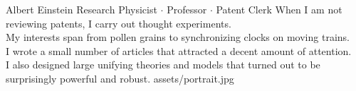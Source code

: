 \documentclass[theme]{cv_einstein}
\begin{document}
    \header
    {Albert Einstein}
    {Research Physicist $\cdot$ Professor $\cdot$ Patent Clerk}
    {
        When I am not reviewing patents, I carry out thought experiments.\\
        My interests span from pollen grains to synchronizing clocks on moving trains.\\
        I wrote a small number of articles that attracted a decent amount of attention.\\
        I also designed large unifying theories and models that turned out to be\\
        surprisingly powerful and robust.%
    }
    {assets/portrait.jpg}


    \vspace{\headerheight} %
\end{document}
